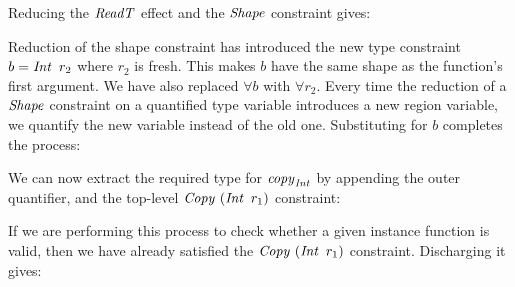 
Reducing the $\operatorname{\mathit{ReadT}}$ effect and the $\operatorname{\mathit{Shape}}$ constraint gives:


Reduction of the shape constraint has introduced the new type constraint $b = \operatorname{\mathit{Int}} \ r_2$ where $r_2$ is fresh. This makes $b$ have the same shape as the function's first argument. We have also replaced $\forall b$ with $\forall r_2$. Every time the reduction of a $\operatorname{\mathit{Shape}}$ constraint on a quantified type variable introduces a new region variable, we quantify the new variable instead of the old one. Substituting for $b$ completes the process:


We can now extract the required type for $\operatorname{\mathit{copy}}_{\operatorname{\mathit{Int}}}$ by appending the outer quantifier, and the top-level $\operatorname{\mathit{Copy}} \ (\operatorname{\mathit{Int}} \ r_1)$ constraint:


If we are performing this process to check whether a given instance function is valid, then we have already satisfied the $\operatorname{\mathit{Copy}} \ (\operatorname{\mathit{Int}} \ r_1)$ constraint. Discharging it gives:


